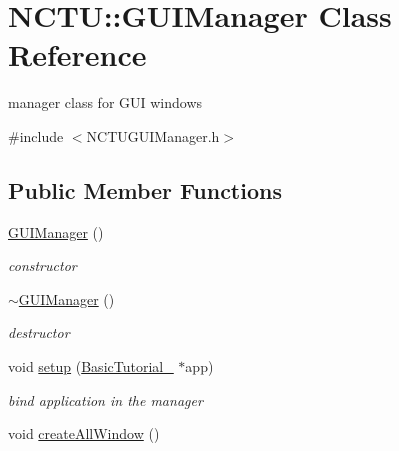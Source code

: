 \hypertarget{class_n_c_t_u_1_1_g_u_i_manager}{}\section{N\+C\+TU\+:\+:G\+U\+I\+Manager Class Reference}
\label{class_n_c_t_u_1_1_g_u_i_manager}


manager class for G\+UI windows  




{\ttfamily \#include $<$N\+C\+T\+U\+G\+U\+I\+Manager.\+h$>$}

\subsection*{Public Member Functions}
\begin{DoxyCompactItemize}
\item 
\hyperlink{class_n_c_t_u_1_1_g_u_i_manager_a5587062fc64af58b9adbe5df4ba25097}{G\+U\+I\+Manager} ()\hypertarget{class_n_c_t_u_1_1_g_u_i_manager_a5587062fc64af58b9adbe5df4ba25097}{}\label{class_n_c_t_u_1_1_g_u_i_manager_a5587062fc64af58b9adbe5df4ba25097}

\begin{DoxyCompactList}\small\item\em constructor \end{DoxyCompactList}\item 
\hyperlink{class_n_c_t_u_1_1_g_u_i_manager_a4e1a7873e94f406c1b6cb4c50d3f2aab}{$\sim$\+G\+U\+I\+Manager} ()\hypertarget{class_n_c_t_u_1_1_g_u_i_manager_a4e1a7873e94f406c1b6cb4c50d3f2aab}{}\label{class_n_c_t_u_1_1_g_u_i_manager_a4e1a7873e94f406c1b6cb4c50d3f2aab}

\begin{DoxyCompactList}\small\item\em destructor \end{DoxyCompactList}\item 
void \hyperlink{class_n_c_t_u_1_1_g_u_i_manager_a443005af7f4d4e48773e3ddfb823fed1}{setup} (\hyperlink{class_basic_tutorial__00}{Basic\+Tutorial\+\_} $\ast$app)\hypertarget{class_n_c_t_u_1_1_g_u_i_manager_a443005af7f4d4e48773e3ddfb823fed1}{}\label{class_n_c_t_u_1_1_g_u_i_manager_a443005af7f4d4e48773e3ddfb823fed1}

\begin{DoxyCompactList}\small\item\em bind application in the manager \end{DoxyCompactList}\item 
void \hyperlink{class_n_c_t_u_1_1_g_u_i_manager_ab081a5ea774dd9a2cc7cc0ecc809573f}{create\+All\+Window} ()\hypertarget{class_n_c_t_u_1_1_g_u_i_manager_ab081a5ea774dd9a2cc7cc0ecc809573f}{}\label{class_n_c_t_u_1_1_g_u_i_manager_ab081a5ea774dd9a2cc7cc0ecc809573f}


\end{DoxyCompactItemize}
